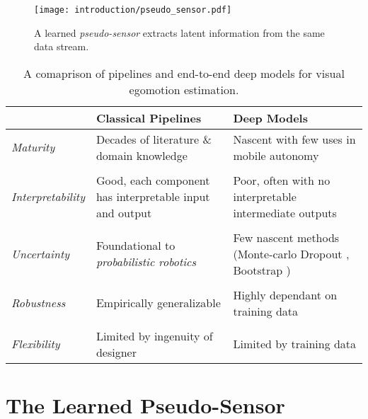 \begin{figure}
\begin{center}
		\texttt{[image: introduction/pseudo\_sensor.pdf]}
		\caption{A learned \textit{pseudo-sensor} extracts latent information from the same data stream.}
  	\label{fig:intro_pseudo_sensor}
\end{center}
\end{figure}


\begin{table}[h!]
	\caption{A comaprison of pipelines and end-to-end deep models for visual egomotion estimation.}
	\begin{threeparttable}
	\begin{tabular}{m{}m{}m{}}
		\toprule
		& \textbf{Classical Pipelines} & \textbf{Deep Models} \\ \midrule  
		\textit{Maturity} & Decades of literature \& domain knowledge & Nascent with few uses in mobile autonomy \\
		& & \\
		\textit{Interpretability} & Good, each component has interpretable input and output & Poor, often with no interpretable intermediate outputs \\
		& & \\
		\textit{Uncertainty} & Foundational to \textit{probabilistic robotics} & Few nascent methods (Monte-carlo Dropout \citep{Gal2016-ny}, Bootstrap \citep{Osband2016-jg})  \\
		& & \\
		\textit{Robustness} & Empirically generalizable \citep{Zhou2019-se} & Highly dependant on training data\\
		& & \\
		\textit{Flexibility} & Limited by ingenuity of designer & Limited by training data \\
		\bottomrule
	\end{tabular}
\end{threeparttable}
\label{tab:intro_classical_vs_deep}
\end{table}

\section{The Learned Pseudo-Sensor}

